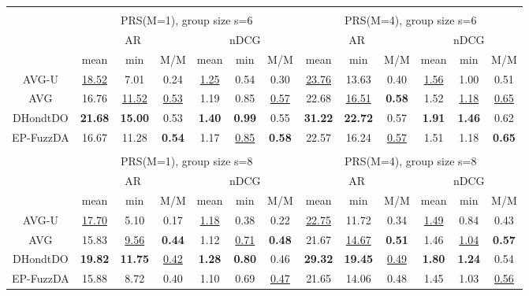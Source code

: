 \begin{tabular}{ c | c c c | c c c || c c c | c c c }
\multicolumn{12}{c}{} \\
\multicolumn{1}{c}{} & \multicolumn{6}{c}{PRS(M=1), group size s=6} & \multicolumn{6}{c}{PRS(M=4), group size s=6} \\
\multicolumn{1}{c}{} & \multicolumn{3}{c}{AR} & \multicolumn{3}{c}{nDCG} & \multicolumn{3}{c}{AR} & \multicolumn{3}{c}{nDCG} \\
& mean & min & M/M & mean & min & M/M & mean & min & M/M & mean & min & M/M \\
\hline
AVG-U & \underline{18.52} & 7.01 & 0.24 & \underline{1.25} & 0.54 & 0.30 & \underline{23.76} & 13.63 & 0.40 & \underline{1.56} & 1.00 & 0.51 \\
AVG & 16.76 & \underline{11.52} & \underline{0.53} & 1.19 & 0.85 & \underline{0.57} & 22.68 & \underline{16.51} & \textbf{0.58} & 1.52 & \underline{1.18} & \underline{0.65} \\
DHondtDO & \textbf{21.68} & \textbf{15.00} & 0.53 & \textbf{1.40} & \textbf{0.99} & 0.55 & \textbf{31.22} & \textbf{22.72} & 0.57 & \textbf{1.91} & \textbf{1.46} & 0.62 \\
EP-FuzzDA & 16.67 & 11.28 & \textbf{0.54} & 1.17 & \underline{0.85} & \textbf{0.58} & 22.57 & 16.24 & \underline{0.57} & 1.51 & 1.18 & \textbf{0.65} \\

\multicolumn{12}{c}{} \\
\multicolumn{1}{c}{} & \multicolumn{6}{c}{PRS(M=1), group size s=8} & \multicolumn{6}{c}{PRS(M=4), group size s=8} \\
\multicolumn{1}{c}{} & \multicolumn{3}{c}{AR} & \multicolumn{3}{c}{nDCG} & \multicolumn{3}{c}{AR} & \multicolumn{3}{c}{nDCG} \\
& mean & min & M/M & mean & min & M/M & mean & min & M/M & mean & min & M/M \\
\hline
AVG-U & \underline{17.70} & 5.10 & 0.17 & \underline{1.18} & 0.38 & 0.22 & \underline{22.75} & 11.72 & 0.34 & \underline{1.49} & 0.84 & 0.43 \\
AVG & 15.83 & \underline{9.56} & \textbf{0.44} & 1.12 & \underline{0.71} & \textbf{0.48} & 21.67 & \underline{14.67} & \textbf{0.51} & 1.46 & \underline{1.04} & \textbf{0.57} \\
DHondtDO & \textbf{19.82} & \textbf{11.75} & \underline{0.42} & \textbf{1.28} & \textbf{0.80} & 0.46 & \textbf{29.32} & \textbf{19.45} & \underline{0.49} & \textbf{1.80} & \textbf{1.24} & 0.54 \\
EP-FuzzDA & 15.88 & 8.72 & 0.40 & 1.10 & 0.69 & \underline{0.47} & 21.65 & 14.06 & 0.48 & 1.45 & 1.03 & \underline{0.56} \\

\end{tabular}
